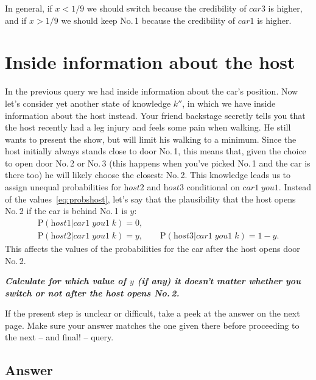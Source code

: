 \documentclass[\ifafour a4paper,12pt,\else a5paper,10pt,\fi%
onecolumn,oneside,article,%
british%
]{memoir}
\theoremstyle{remark}
\theoremstyle{innote}
\newcommand{\addsubsec}[1]{\subsection*{#1}\addcontentsline{toc}{subsection}{#1}}
\newcommand*{\p}{\mathrm{P}}%
\renewcommand*{\|}{\nonscript\,\vert\nonscript\;\mathopen{}}
\newcommand*{\cara}{\textit{car1}}
\newcommand*{\carc}{\textit{car3}}
\newcommand*{\hosta}{\textit{host1}}
\newcommand*{\hostb}{\textit{host2}}
\newcommand*{\hostc}{\textit{host3}}
\newcommand*{\youa}{\textit{you1}}
\newcommand*{\quest}[1]{\emph{\textbf{\color{mygreen}#1}}}
\begin{document}
In general, if $x<1/9$ we should switch because the credibility of $\carc$
is higher, and if $x>1/9$ we should keep No.\,1 because the credibility of
$\cara$ is higher.


\clearpage

\section{Inside information about the host}
\label{sec:inside_host}

In the previous query we had inside information about the car's position.
Now let's consider yet another state of knowledge $k''$, in which we have
inside information about the host instead. Your friend backstage secretly
tells you that the host recently had a leg injury and feels some pain when
walking. He still wants to present the show, but will limit his walking to a
minimum. Since the host initially always stands close to door No.\,1, this
means that, given the choice to open door No.\,2 or No.\,3 (this happens
when you've picked No.\,1 and the car is there too) he will likely
choose the closest: No.\,2. This knowledge leads us to assign unequal
probabilities for $\hostb$ and $\hostc$ conditional on $\cara\;\youa$.
Instead of the values~\eqref{eq:probshost}, let's say that the plausibility
that the host opens No.\,2 if the car is behind No.\,1 is $y$:
  \begin{equation}\label{eq:host_choice_new}
    \begin{gathered}
      \p(\hosta|\cara\;\youa\;k) = 0,\\
      \p(\hostb|\cara\;\youa\;k) = y,\qquad
      \p(\hostc|\cara\;\youa\;k) = 1-y.
      \end{gathered}
\end{equation}
This affects the values of the probabilities for the car after the host
opens door No.\,2.

\medskip

\quest{Calculate for which value of $y$ (if any) it doesn't matter whether
  you switch or not after the host opens No.\,2.}

\medskip

If the present step is unclear or difficult, take a peek at the answer on
the next page. Make sure your answer matches the one given there before
proceeding to the next -- and final! -- query.



\clearpage

\addsubsec{Answer}
\end{document}
